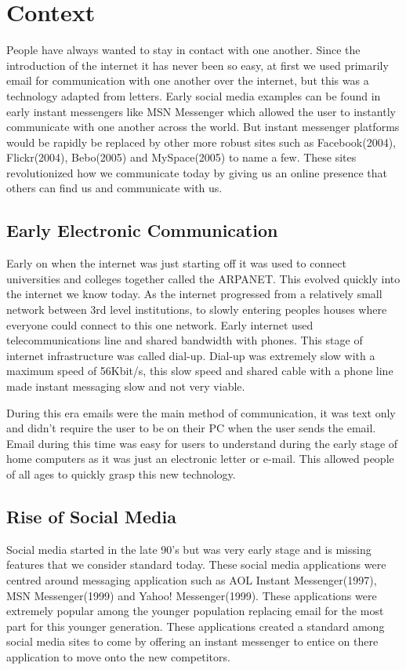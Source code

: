 \chapter{Context}
People have always wanted to stay in contact with one another. Since the introduction of the internet it has never been so easy, at first we used primarily email for communication with one another over the internet, but this was a technology adapted from letters. Early social media examples can be found in early instant messengers like MSN Messenger which allowed the user to instantly communicate with one another across the world. But instant messenger platforms would be rapidly be replaced by other more robust sites such as Facebook(2004), Flickr(2004), Bebo(2005) and MySpace(2005) to name a few. These sites revolutionized how we communicate today by giving us an online presence that others can find us and communicate with us.

\section{Early Electronic Communication}
Early on when the internet was just starting off it was used to connect universities and colleges together called the ARPANET. This evolved quickly into the internet we know today. As the internet progressed from a relatively small network between 3rd level institutions, to slowly entering peoples houses where everyone could connect to this one network. Early internet used telecommunications line and shared bandwidth with phones. This stage of internet infrastructure was called dial-up. Dial-up was extremely slow with a maximum speed of 56Kbit/s, this slow speed and shared cable with a phone line made instant messaging slow and not very viable.

During this era emails were the main method of communication, it was text only and didn't require the user to be on their PC when the user sends the email. Email during this time was easy for users to understand during the early stage of home computers as it was just an electronic letter or e-mail. This allowed people of all ages to quickly grasp this new technology.

\section{Rise of Social Media}
Social media started in the late 90's but was very early stage and is missing features that we consider standard today. These social media applications were centred around messaging application such as AOL Instant Messenger(1997), MSN Messenger(1999) and Yahoo! Messenger(1999). These applications were extremely popular among the younger population replacing email for the most part for this younger generation. These applications created a standard among social media sites to come by offering an instant messenger to entice on there application to move onto the new competitors.

